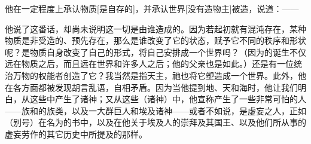 他在一定程度上承认物质[是自存的]，并承认世界[没有造物主]被造，说道：——\par

\par

他说了这番话，却尚未说明这一切是由谁造成的。因为若起初就有混沌存在，某种物质是非受造的、预先存在，那么是谁改变了它的状态，赋予它不同的秩序和形状呢？是物质自身改变了自己的形式，将自己安排成一个世界吗？（因为的诞生不仅远在物质之后，而且远在世界和许多人之后；他的父亲也是如此。）还是有一位统治万物的权能者创造了它？我当然是指天主，祂也将它塑造成一个世界。此外，他在各方面都被发现胡言乱语，自相矛盾。因为当他提到地、天和海时，他让我们明白，从这些中产生了诸神；又从这些（诸神）中，他宣称产生了一些非常可怕的人——族和的族类，以及一大群巨人和埃及诸神——或者不如说，是虚妄之人，正如（别号）在名为的书中，以及在他关于埃及人的崇拜及其国王、以及他们所从事的虚妄劳作的其它历史中所提及的那样。\par

